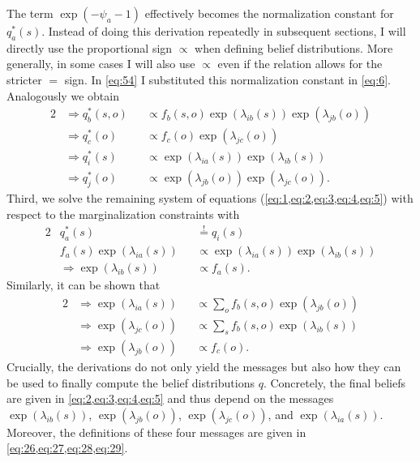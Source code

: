 The term \(\exp(-\psi_a - 1)\) effectively becomes the normalization constant for \(q_a^*(s)\). Instead of doing this derivation repeatedly in subsequent sections, I will directly use the proportional sign \(\propto\) when defining belief distributions. More generally, in some cases I will also use \(\propto\) even if the relation allows for the stricter \(=\) sign. In \cref{eq:54} I substituted this normalization constant in \cref{eq:6}.
Analogously we obtain
\begin{alignat}{2}
     & \Rightarrow q_b^*(s,o) &  & \propto f_b(s,o) \exp(\lambda_{ib}(s)) \exp(\lambda_{jb}(o)) \label{eq:2} \\
     & \Rightarrow q_c^*(o)   &  & \propto f_c(o) \exp(\lambda_{jc}(o))                         \label{eq:3} \\
     & \Rightarrow q_i^*(s)   &  & \propto \exp(\lambda_{ia}(s)) \exp(\lambda_{ib}(s))          \label{eq:4} \\
     & \Rightarrow q_j^*(o)   &  & \propto \exp(\lambda_{jb}(o)) \exp(\lambda_{jc}(o)).\label{eq:5}
\end{alignat}
Third, we solve the remaining system of equations (\cref{eq:1,eq:2,eq:3,eq:4,eq:5}) with respect to the marginalization constraints with
\begin{alignat}{2}
     & q_a^*(s)                          &  & \overset{!}{=} q_i(s)                               \\
     & f_a(s) \exp(\lambda_{ia}(s))      &  & \propto \exp(\lambda_{ia}(s)) \exp(\lambda_{ib}(s)) \\
     & \Rightarrow \exp(\lambda_{ib}(s)) &  & \propto f_a(s). \label{eq:26}
\end{alignat}
Similarly, it can be shown that
\begin{alignat}{2}
     & \Rightarrow \exp(\lambda_{ia}(s)) &  & \propto \sum_o f_b(s,o) \exp(\lambda_{jb}(o)) \label{eq:27}    \\
     & \Rightarrow \exp(\lambda_{jc}(o)) &  & \propto \sum_s f_b(s,o) \exp(\lambda_{ib}(s))    \label{eq:28} \\
     & \Rightarrow \exp(\lambda_{jb}(o)) &  & \propto f_c(o). \label{eq:29}
\end{alignat}
Crucially, the derivations do not only yield the messages but also how they can be used to finally compute the belief distributions \(q\). Concretely, the final beliefs are given in \cref{eq:2,eq:3,eq:4,eq:5} and thus depend on the messages \(\exp(\lambda_{ib}(s))\), \(\exp(\lambda_{jb}(o))\), \(\exp(\lambda_{jc}(o))\), and \(\exp(\lambda_{ia}(s))\). Moreover, the definitions of these four messages are given in \cref{eq:26,eq:27,eq:28,eq:29}.

